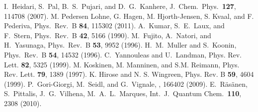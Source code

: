 \documentclass[twocolumn]{revtex4}
\begin{document}
\begin{thebibliography}{200}
 I.~Heidari, S.~Pal, B.~S.~Pujari, and D.~G.~Kanhere, J.~Chem.~Phys.~{\bf 127}, 
114708 (2007).
 M. Pedersen Lohne, G. Hagen, M. Hjorth-Jensen, S. Kvaal, and F. Pederiva, Phys.~Rev.~B {\bf 84}, 115302 (2011).
 A.~Kumar, S.~E.~Laux, and F.~Stern, Phys.~Rev.~B {\bf 42}, 5166 (1990).
 M.~Fujito, A.~Natori, and H.~Yasunaga, Phys.~Rev.~B {\bf 53}, 9952 (1996).
 H.~M.~Muller and S.~Koonin, Phys.~Rev.~B {\bf 54}, 14532 (1996).
 C.~Yannouleas and U.~Landman, Phys. Rev. Lett. {\bf 82}, 5325 (1999).
 M. Koskinen, M. Manninen, and S.M. Reimann, Phys. Rev. Lett. {\bf 79}, 1389 (1997).
 K. Hirose and N. S. Wingreen, Phys. Rev. B {\bf 59}, 4604 (1999).
 P.~Gori-Giorgi, M.~Seidl, and G.~Vignale, , 166402 (2009).
 E.~R\"as\"anen, S.~Pittalis, J.~G.~Vilhena, M.~A.~L.~Marques, Int.~J.~Quantum Chem.~{\bf 110}, 2308 (2010). 
\end{thebibliography}
\end{document}
